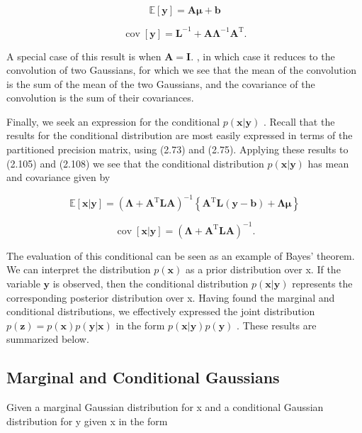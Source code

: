 \documentclass[
  10
]{article}
\begin{document}
\[
\mathbb {E} [ \mathbf {y} ] = \mathbf {A} \boldsymbol {\mu} + \mathbf {b}\tag{2.109}
\]

\[
\operatorname{cov} [ \mathbf {y} ] = \mathbf {L} ^ {- 1} + \mathbf {A} \boldsymbol {\Lambda} ^ {- 1} \mathbf {A} ^ {\mathrm{T}}.\tag{2.110}
\]

A special case of this result is when
\(\mathbf { A } = \mathbf { I } .\) , in which case it reduces to the
convolution of two Gaussians, for which we see that the mean of the
convolution is the sum of the mean of the two Gaussians, and the
covariance of the convolution is the sum of their covariances.

Finally, we seek an expression for the conditional
\(p ( \mathbf { x } | \mathbf { y } )\) . Recall that the results for
the conditional distribution are most easily expressed in terms of the
partitioned precision matrix, using (2.73) and (2.75). Applying these
results to (2.105) and (2.108) we see that the conditional distribution
\(p ( \mathbf { x } | \mathbf { y } )\) has mean and covariance given by

\[
\mathbb {E} [ \mathbf {x} | \mathbf {y} ] = (\boldsymbol {\Lambda} + \mathbf {A} ^ {\mathrm{T}} \mathbf {L} \mathbf {A}) ^ {- 1} \left\{\mathbf {A} ^ {\mathrm{T}} \mathbf {L} (\mathbf {y} - \mathbf {b}) + \boldsymbol {\Lambda} \boldsymbol {\mu} \right\}\tag{2.111}
\]

\[
\operatorname{cov} [ \mathbf {x} | \mathbf {y} ] = (\boldsymbol {\Lambda} + \mathbf {A} ^ {\mathrm{T}} \mathbf {L} \mathbf {A}) ^ {- 1}.\tag{2.112}
\]

The evaluation of this conditional can be seen as an example of Bayes'
theorem. We can interpret the distribution \(p ( \mathbf { x } )\) as a
prior distribution over x. If the variable \(\mathbf { y }\) is
observed, then the conditional distribution
\(p ( \mathbf { x } | \mathbf { y } )\) represents the corresponding
posterior distribution over x. Having found the marginal and conditional
distributions, we effectively expressed the joint distribution
\(p ( \mathbf { z } ) = p ( \mathbf { x } ) p ( \mathbf { y } | \mathbf { x } )\)
in the form \(p ( \mathbf { x } | \mathbf { y } ) p ( \mathbf { y } )\)
. These results are summarized below.

\subsection{Marginal and Conditional
Gaussians}\label{marginal-and-conditional-gaussians}

Given a marginal Gaussian distribution for x and a conditional Gaussian
distribution for y given x in the form
\end{document}
